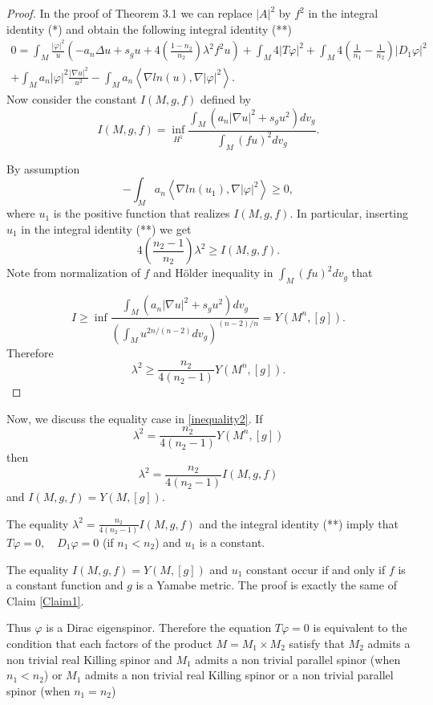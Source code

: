 \documentclass[11pt]{amsart}
\theoremstyle{plain}
\numberwithin{equation}{section}
\theoremstyle{plain}
\begin{document}
\begin{proof}
In the proof of  Theorem 3.1 we can replace $|A|^2$ by $f^2$ in the integral identity (*) and obtain the following integral identity (**)
\begin{align*}
0=\int_M\frac{|\varphi|^2}{u}\left(-a_n\Delta u+s_gu+4\left(\frac{1-n_2}{n_2}\right)\lambda^2f^2u\right)+\int_M 4|T\varphi|^2+\int_M 4\left( \frac{1}{n_1}-\frac{1}{n_2}\right)|D_1\varphi|^2\\
+\int_M a_n|\varphi|^2\frac{|\nabla u|^2}{u^2}-\int_Ma_n\left\langle\nabla ln(u),\nabla |\varphi|^2\right\rangle.
\end{align*}
Now consider the constant $I(M,g,f)$ defined by $$I(M,g,f)=\inf_{H^1}\frac{\int_M\left( a_n|\nabla u|^2+s_gu^2\right)dv_g}{\int_M (fu)^2dv_g}.$$

By assumption $$-\int_Ma_n\left\langle\nabla ln(u_1),\nabla |\varphi|^2\right\rangle\geq 0,$$
where $u_1$ is the positive function that realizes $I(M,g,f)$.
In particular, inserting $u_1$ in the integral identity (**) we get $$4\left(\frac{n_2-1}{n_2}\right)\lambda^2\geq I(M,g,f).$$
Note from normalization of $f$ and Hölder inequality in $\int_M (fu)^2dv_g$ that

 $$I\geq \inf \frac{\int_M\left( a_n|\nabla u|^2+s_gu^2\right)dv_g}{\left(\int_Mu^{2n/(n-2)}dv_g\right)^{(n-2)/n}}=Y(M^n,[g]). $$ 
Therefore $$\lambda^2\geq \frac{n_2}{4(n_2-1)}Y(M^n,[g]).$$
 
 
\end{proof}
 
Now, we discuss the equality case in \eqref{inequality2}.
If $$\lambda^2=\frac{n_2}{4(n_2-1)}Y(M^n,[g])$$ then
$$\lambda^2=\frac{n_2}{4(n_2-1)}I(M,g,f)$$ and $I(M,g,f)=Y(M,[g])$.

The equality $\lambda^2=\frac{n_2}{4(n_2-1)}I(M,g,f)$ and the integral identity (**) imply that $T\varphi=0,\quad D_1\varphi=0$ (if $n_1<n_2$) and $u_1$ is a constant.

The equality $I(M,g,f)=Y(M,[g])$  and $u_1$ constant occur if and only if  $f$ is a constant function and $g$ is a Yamabe metric. The proof is exactly the same of Claim \ref{Claim1}.


Thus $\varphi$ is a Dirac eigenspinor. Therefore the equation $T\varphi=0$ is equivalent to the condition that each factors of the product $M=M_1\times M_2$  satisfy that $M_2$ admits a non trivial real Killing spinor and $M_1$ admits a non trivial parallel spinor (when $n_1<n_2$) or $M_1$ admits a non trivial real Killing spinor or a non trivial parallel spinor (when $n_1=n_2$)
 
\end{document}
